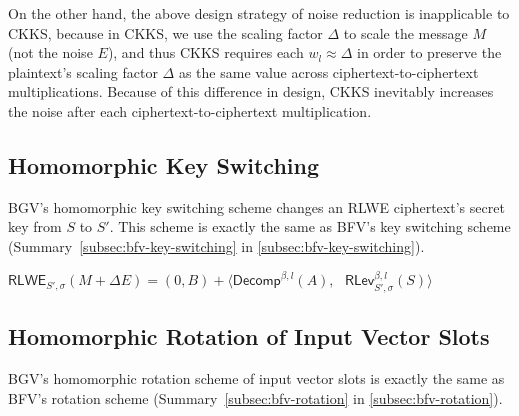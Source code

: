 On the other hand, the above design strategy of noise reduction is inapplicable to CKKS, because in CKKS, we use the scaling factor $\Delta$ to scale the message $M$ (not the noise $E$), and thus CKKS requires each $w_l \approx \Delta$ in order to preserve the plaintext's scaling factor $\Delta$ as the same value across ciphertext-to-ciphertext multiplications. Because of this difference in design, CKKS inevitably increases the noise after each ciphertext-to-ciphertext multiplication. 


\subsection{Homomorphic Key Switching}
\label{subsec:bgv-key-switching}

BGV's homomorphic key switching scheme changes an RLWE ciphertext's secret key from $S$ to $S'$. This scheme is exactly the same as BFV's key switching scheme (Summary~\ref*{subsec:bfv-key-switching} in \autoref{subsec:bfv-key-switching}).

\begin{tcolorbox}[title={\textbf{\tboxlabel{\ref*{subsec:bgv-key-switching}} BGV's Key Switching}}]
$\textsf{RLWE}_{S',\sigma}(M + \Delta E) = (0, B) + \bm{\langle} \textsf{Decomp}^{\beta, l}(A), \text{ } \textsf{RLev}_{S', \sigma}^{\beta, l}(S) \bm{\rangle}$
\end{tcolorbox}



\subsection{Homomorphic Rotation of Input Vector Slots}
\label{subsec:bgv-rotation}


BGV's homomorphic rotation scheme of input vector slots is exactly the same as BFV's rotation scheme (Summary~\ref*{subsec:bfv-rotation} in \autoref{subsec:bfv-rotation}). 


